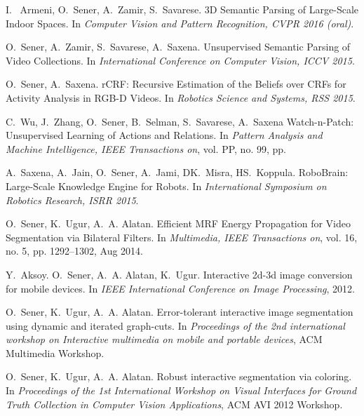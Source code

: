 I. ~Armeni, O.~Sener, A.~Zamir, S.~Savarese.
\newblock 3D Semantic Parsing of Large-Scale Indoor Spaces.
\newblock In {\em Computer Vision and Pattern Recognition, CVPR 2016 (oral)}.
\vspace{-2mm}

O.~Sener, A.~Zamir, S.~Savarese, A.~Saxena.
\newblock Unsupervised Semantic Parsing of Video Collections.
\newblock In {\em International Conference on Computer Vision, ICCV 2015}.
\vspace{-2mm}

O.~Sener, A.~Saxena.
\newblock rCRF: Recursive Estimation of the Beliefs over CRFs for Activity Analysis in RGB-D Videos.
\newblock In {\em Robotics Science and Systems, RSS 2015}.
\vspace{-2mm}


C.~Wu, J.~Zhang, O.~Sener, B.~Selman, S.~Savarese, A.~Saxena
\newblock Watch-n-Patch: Unsupervised Learning of Actions and Relations.
\newblock In {\em Pattern Analysis and Machine Intelligence, IEEE Transactions on}, vol. PP, no. 99, pp.


A.~Saxena, A.~Jain, O.~Sener, A.~Jami, DK.~Misra, HS.~Koppula.
\newblock RoboBrain: Large-Scale Knowledge Engine for Robots.
\newblock In {\em International Symposium on Robotics Research, ISRR 2015}.
\vspace{-2mm}

O.~Sener, K.~Ugur, A.~A. Alatan.
\newblock Efficient MRF Energy Propagation for Video Segmentation via Bilateral Filters.
\newblock In {\em Multimedia, IEEE Transactions on}, vol. 16, no. 5, pp. 1292–1302, Aug 2014.


Y.~Aksoy. O.~Sener, A.~A. Alatan, K.~Ugur.
\newblock Interactive 2d-3d image conversion for mobile devices.
\newblock In {\em IEEE International Conference on Image Processing}, 2012.
\vspace{-2mm}

	O.~Sener, K.~Ugur, A.~A. Alatan.
	\newblock Error-tolerant interactive image segmentation using dynamic and iterated graph-cuts.
	\newblock In {\em Proceedings of the 2nd international workshop on Interactive multimedia on mobile and portable devices}, ACM Multimedia Workshop.

    O.~Sener, K.~Ugur, A.~A. Alatan.
	\newblock Robust interactive segmentation via coloring.
	\newblock In {\em Proceedings of the 1st International Workshop on Visual
  	Interfaces for Ground Truth Collection in Computer Vision Applications},
  	ACM AVI 2012 Workshop.